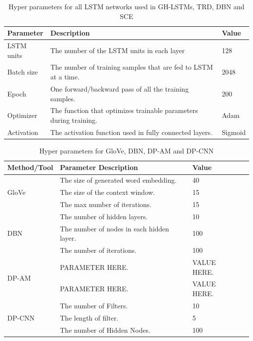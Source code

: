 \documentclass[journal]{IEEEtran}
\begin{document}
\begin{table}[htbp]
	\footnotesize
	\caption{Hyper parameters for all LSTM networks used in GH-LSTMs, TRD, DBN and SCE}
	\label{tab_parameters}
	\tabcolsep 40pt
	\centering
	\begin{tabular}{lll}
		\toprule
		Parameter      & Description & Value \\\midrule
		LSTM units     & The number of the LSTM units in each layer & 128 \\
		Batch size     & The number of training samples that are fed to LSTM at a time. & 2048 \\
		Epoch          & One forward/backward pass of all the training samples. & 200         \\
		Optimizer      & The function that optimizes trainable parameters during training. & Adam        \\
		Activation     & The activation function used in fully connected layers. & Sigmoid\\
		\bottomrule
	\end{tabular}
\end{table}

\begin{table}[htbp]
	\footnotesize
	\caption{Hyper parameters for GloVe, DBN, DP-AM and DP-CNN}
	\label{tab_other_parameters}
	\tabcolsep 40pt
	\centering
	\begin{tabular}{llll}
		\toprule
		Method/Tool             & Parameter Description                      & Value               \\\midrule
		\multirow{3}{*}{GloVe}  & The size of generated word embedding.      & 40                  \\
		                        & The size of the context window.            & 15                  \\
		                        & The max number of iterations.              & 15                  \\\midrule
		\multirow{3}{*}{DBN}    & The number of hidden layers.               & 10                  \\
		                        & The number of nodes in each hidden layer.  & 100                 \\
		                        & The number of iterations.                  & 100                 \\\midrule
		\multirow{2}{*}{DP-AM}  & PARAMETER HERE.                            & VALUE HERE.         \\
		                        & PARAMETER HERE.                            & VALUE HERE.         \\\midrule
		\multirow{3}{*}{DP-CNN} & The number of Filters.                     & 10                  \\
		                        & The length of filter.                      & 5                   \\
		                        & The number of Hidden Nodes.                & 100                 \\
		\bottomrule
	\end{tabular}
\end{table}
\end{document}
